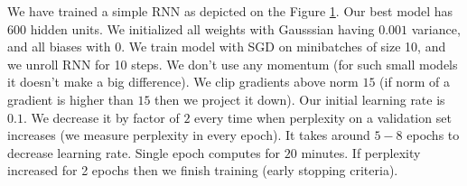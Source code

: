 \documentclass{article}
\begin{document}
We have trained a simple RNN as depicted on the Figure \ref{fig:schema}. Our best model has 600 hidden units.
We initialized all weights with Gausssian having $0.001$ variance, and all biases with $0$. We train model with
SGD on minibatches of size 10, and we unroll RNN for 10 steps. We don't use any momentum (for such small models 
it doesn't make a big difference). We clip gradients above norm $15$ (if norm of a gradient is higher than $15$ then
we project it down).
Our initial learning rate is $0.1$. We decrease it by factor of $2$ every time
when perplexity on a validation set increases (we measure perplexity in every epoch). It takes around $5-8$ epochs
to decrease learning rate. Single epoch computes for $20$ minutes.
If perplexity increased 
for 2 epochs then we finish training (early stopping criteria).

\begin{figure}
  \label{fig:schema}
\end{figure}
\end{document}
